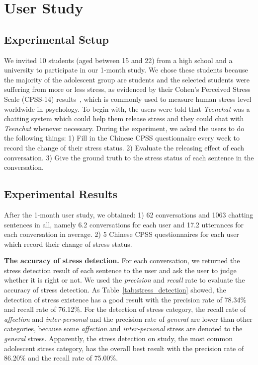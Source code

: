 \section{User Study }
\subsection{Experimental Setup}
We invited 10 students (aged between 15 and 22) from a high school and a university to participate in our 1-month study. We chose these students because the  majority of the adolescent group are students and the selected students were suffering from more or less stress, as evidenced by their Cohen's Perceived Stress Scale (CPSS-14) results~\cite{SC1983}, which is commonly used to measure human stress level worldwide in psychology. To begin with, the users were told that \emph{Teenchat} was a chatting system which could help them release stress and they could chat with \emph{Teenchat} whenever necessary. During the experiment, we asked the users to do the following things: 1) Fill in the Chinese CPSS questionnaire every week to record the change of their stress status. 2) Evaluate the releasing effect of each conversation. 3) Give the ground truth to the stress status of each sentence in the conversation.
\subsection{Experimental Results}
After the 1-month user study, we obtained: 1) 62 conversations and 1063 chatting sentences in all, namely 6.2 conversations for each user and 17.2 utterances for each conversation in average. 2) 5 Chinese CPSS questionnaires for each user which record their change of  stress status.

\textbf{The accuracy of stress detection. }
 For each conversation, we returned the stress detection result of each sentence to the user and ask the user to judge whether it is right or not. We used the \emph{precision} and \emph{recall} rate to evaluate the accuracy of stress detection. As Table~\ref{tab:stress_detection} showed, the detection of stress existence has a good result with the precision rate of 78.34\% and recall rate of 76.12\%. For the detection of stress category, the recall rate of \emph{affection} and \emph{inter-personal} and the precision rate of \emph{general} are lower than other categories, because some \emph{affection} and \emph{inter-personal} stress are denoted to the \emph{general} stress. Apparently, the stress detection on study, the most common adolescent stress category, has the overall best result with the precision rate of 86.20\% and the recall rate  of 75.00\%.
 
